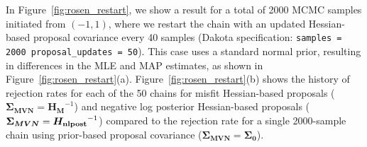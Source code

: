 In Figure~\ref{fig:rosen_restart}, we show a result for a total of
2000 MCMC samples initiated from $(-1,1)$, where we restart the chain
with an updated Hessian-based proposal covariance every 40
samples (Dakota specification: \texttt{samples = 2000
  proposal\_updates = 50}).  This case uses a standard normal prior,
resulting in differences in the MLE and MAP estimates, as shown in
Figure~\ref{fig:rosen_restart}(a).  Figure~\ref{fig:rosen_restart}(b)
shows the history of rejection rates for each of the 50 chains for
misfit Hessian-based proposals 
($\boldsymbol{\Sigma_{MVN}} = \boldsymbol{H_M}^{-1}$)
and negative log posterior Hessian-based proposals 
($\boldsymbol{\Sigma_{MVN}} = \boldsymbol{H_{\rm nlpost}}^{-1}$)
compared to the rejection rate for a single 2000-sample chain 
using prior-based proposal covariance 
($\boldsymbol{\Sigma_{MVN}} = \boldsymbol{\Sigma_0}$).
